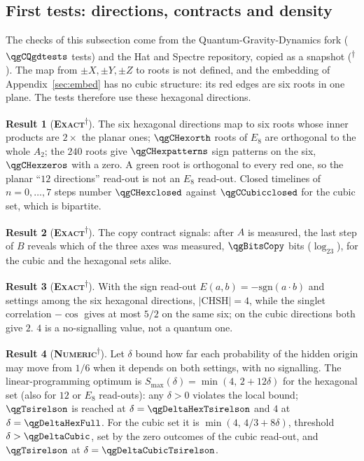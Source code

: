 \documentclass[11pt]{article}
\newcommand{\exact}{\textbf{\textsc{Exact}}}
\newcommand{\numeric}{\textbf{\textsc{Numeric}}}
\newcommand{\snap}{\textsuperscript{$\dagger$}}      %
\theoremstyle{definition}
\newtheorem{result}{Result}
\begin{document}
\subsection{First tests: directions, contracts and density}\label{sec:dynamic-tests}
\label{sec:hexdirs}\label{sec:retro-tests}
The checks of this subsection come from the Quantum-Gravity-Dynamics fork ($\qgCQgdtests$ tests) and the Hat and Spectre repository, copied as a snapshot (\snap). The map from $\pm X,\pm Y,\pm Z$ to roots is not defined, and the embedding of Appendix~\ref{sec:embed} has no cubic structure: its red edges are six roots in one plane. The tests therefore use these hexagonal directions.
\begin{result}[\exact\snap]\label{res:hexdirs}
The six hexagonal directions map to six roots whose inner products are $2\times$ the planar ones; $\qgCHexorth$ roots of $E_8$ are orthogonal to the whole $A_2$; the $240$ roots give $\qgCHexpatterns$ sign patterns on the six, $\qgCHexzeros$ with a zero. A green root is orthogonal to every red one, so the planar ``$12$ directions'' read-out is not an $E_8$ read-out. Closed timelines of $n=0,\dots,7$ steps number $\qgCHexclosed$ against $\qgCCubicclosed$ for the cubic set, which is bipartite.
\end{result}
\begin{result}[\exact\snap]\label{res:copy}
The copy contract signals: after $A$ is measured, the last step of $B$ reveals which of the three axes was measured, $\qgBitsCopy$ bits ($\log_23$), for the cubic and the hexagonal sets alike.
\end{result}
\begin{result}[\exact\snap]\label{res:chsh}
With the sign read-out $E(a,b)=-\mathrm{sgn}(a\cdot b)$ and settings among the six hexagonal directions, $|\mathrm{CHSH}|=4$, while the singlet correlation $-\cos$ gives at most $5/2$ on the same six; on the cubic directions both give $2$. $4$ is a no-signalling value, not a quantum one.
\end{result}
\begin{result}[\numeric\snap]\label{res:price}
Let $\delta$ bound how far each probability of the hidden origin may move from $1/6$ when it depends on both settings, with no signalling. The linear-programming optimum is $S_{\max}(\delta)=\min(4,\,2+12\delta)$ for the hexagonal set (also for $12$ or $E_8$ read-outs): any $\delta>0$ violates the local bound; $\qgTsirelson$ is reached at $\delta=\qgDeltaHexTsirelson$ and $4$ at $\delta=\qgDeltaHexFull$. For the cubic set it is $\min(4,\,4/3+8\delta)$, threshold $\delta>\qgDeltaCubic$, set by the zero outcomes of the cubic read-out, and $\qgTsirelson$ at $\delta=\qgDeltaCubicTsirelson$.
\end{result}
\end{document}
